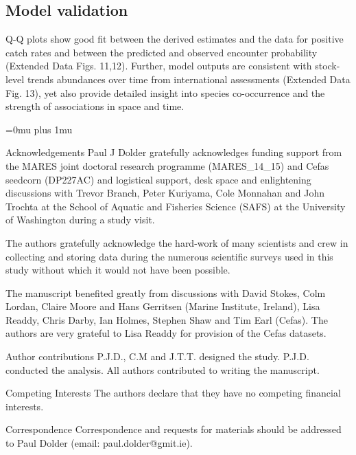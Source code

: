 \documentclass{nature}
\begin{document}
\begin{linenumbers}
\subsection{Model validation}

Q-Q plots show good fit between the derived estimates and the data for positive
catch rates and between the predicted and observed encounter probability
(Extended Data Figs. 11,12).  Further, model outputs are consistent with
stock-level trends abundances over time from international assessments
(Extended Data Fig. 13), yet also provide detailed insight into species
co-occurrence and the strength of associations in space and time. 

\end{linenumbers}
\newpage
\Urlmuskip=0mu plus 1mu\relax

\small{}


\newpage


\begin{addendum}
 \item [Acknowledgements] Paul J Dolder gratefully acknowledges funding support
	 from the MARES joint doctoral research programme (MARES\_14\_15) and
	 Cefas seedcorn (DP227AC) and logistical support, desk space and
	 enlightening discussions with Trevor Branch, Peter Kuriyama, Cole
	 Monnahan and John Trochta at the School of Aquatic and Fisheries
	 Science (SAFS) at the University of Washington during a study visit.
	 
	 The authors gratefully acknowledge the hard-work of many scientists
	 and crew in collecting and storing data during the numerous scientific
	 surveys used in this study without which it would not have been
	 possible.  
	 
	 The manuscript benefited greatly from discussions with David Stokes,
	 Colm Lordan, Claire Moore and Hans Gerritsen (Marine Institute,
	 Ireland), Lisa Readdy, Chris Darby, Ian Holmes, Stephen Shaw and Tim
	 Earl (Cefas).  The authors are very grateful to Lisa Readdy for
	 provision of the Cefas datasets.

 \item[Author contributions] P.J.D., C.M and J.T.T. designed the study. P.J.D.
	 conducted the analysis. All authors contributed to writing the
	 manuscript.  

 \item[Competing Interests] The authors declare that they have
	 no competing financial interests.
 \item[Correspondence] Correspondence and requests for materials
 should be addressed to Paul Dolder (email: paul.dolder@gmit.ie).
 \end{addendum}
\end{document}
